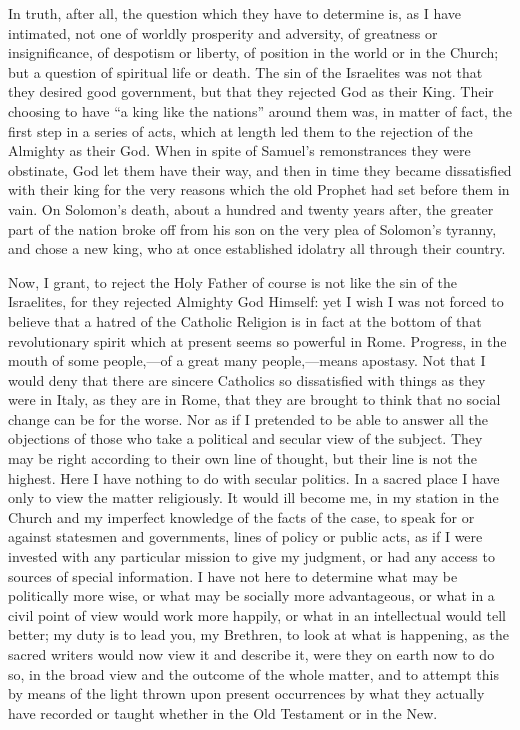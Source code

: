 In truth, after all, the question which they have to
determine is, as I have intimated, not one of worldly
prosperity and adversity, of greatness or insignificance,
of despotism or liberty, of position in the world or in
the Church; but a question of spiritual life or death.
The sin of the Israelites was not that they desired good
government, but that they rejected God as their King.
Their choosing to have ``a king like the
nations'' around them was, in matter of fact, the
first step in a series of acts, which at length led them
to the rejection of the Almighty as their God. When in
spite of Samuel's remonstrances they were obstinate, God
let them have their way, and then in time they became
dissatisfied with their king for the very reasons which
the old Prophet had set before them in vain. On Solomon's
death, about a hundred and twenty years after, the
greater part of the nation broke off from his son on the
very plea of Solomon's tyranny, and chose a new king, who
at once established idolatry all through their country.

Now, I grant, to reject the Holy Father of course is
not like the sin of the Israelites, for they rejected
Almighty God Himself: yet I wish I was not forced to
believe that a hatred of the Catholic Religion is in fact
at the bottom of that revolutionary spirit which at
present seems so powerful in Rome. Progress, in the mouth
of some people,—of a great many people,—means
apostasy. Not that I would deny that there are sincere
Catholics so dissatisfied with things as they were in
Italy, as they are in Rome, that they are brought to
think that no social change can be for the worse. Nor as
if I pretended to be able to answer all the objections of
those who take a political and secular view of the
subject. They may be right according to their own line of
thought, but their line is not the highest. Here I have
nothing to do with secular politics. In a sacred place I
have only to view the matter religiously. It would ill
become me, in my station in the Church and my imperfect
knowledge of the facts of the case, to speak for or
against statesmen and governments, lines of policy or
public acts, as if I were invested with any particular
mission to give my judgment, or had any access to sources
of special information. I have not here to determine what
may be politically more wise, or what may be socially
more advantageous, or what in a civil point of view would
work more happily, or what in an intellectual would tell
better; my duty is to lead you, my Brethren, to look at
what is happening, as the sacred writers would now view
it and describe it, were they on earth now to do so, in
the broad view and the outcome of the whole matter, and
to attempt this by means of the light thrown upon present
occurrences by what they actually have recorded or taught
whether in the Old Testament or in the New.

